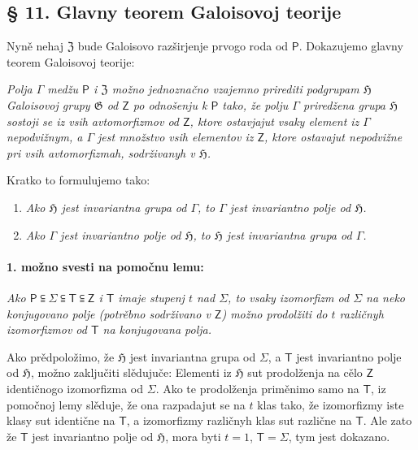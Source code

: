 \documentclass[11pt]{article}
\begin{document}
\subsection*{§ 11. Glavny teorem Galoisovoj teorije}\label{der-hauptsatz-der-galoisschen-theorie}

Nyně nehaj \(\mathfrak Z\) bude Galoisovo razširjenje prvogo roda od \(\mathsf P\). Dokazujemo glavny teorem Galoisovoj teorije:

\emph{Polja \(\Gamma\) medžu \(\mathsf P\) i \(\mathfrak Z\) možno jednoznačno vzajemno prirediti podgrupam \(\mathfrak H\) Galoisovoj grupy \(\mathfrak G\) od \(\mathsf{Z}\) po odnošenju k \(\mathsf P\) tako, že polju \(\Gamma\) priredžena grupa \(\mathfrak H\) sostoji se iz vsih avtomorfizmov od \(\mathsf{Z}\), ktore ostavjajut vsaky element iz \(\Gamma\) nepodvižnym, a \(\Gamma\) jest množstvo vsih elementov iz \(\mathsf{Z}\), ktore ostavajut nepodvižne pri vsih avtomorfizmah, sodrživanyh v \(\mathfrak H\).}

Kratko to formulujemo tako:

\begin{enumerate}
\item \emph{Ako \(\mathfrak H\) jest invariantna grupa od \(\Gamma\), to \(\Gamma\) jest invariantno polje od \(\mathfrak H\).}
\item \emph{Ako \(\Gamma\) jest invariantno polje od \(\mathfrak H\), to \(\mathfrak H\) jest invariantna grupa od \(\Gamma\).}
\end{enumerate}

\paragraph{1. možno svesti na pomočnu lemu:}\label{laesst-sich-zurueckfuehren-auf-den-hilfssatz}

\emph{Ako \(\mathsf P \subseteqq \Sigma \subseteqq \mathsf T \subseteqq \mathsf Z\) i \(\mathsf T\) imaje stupenj \(t\) nad \(\Sigma\), to vsaky izomorfizm od \(\Sigma\) na neko konjugovano polje (potrěbno sodrživano v \(\mathsf Z\)) možno prodolžiti do \(t\) različnyh izomorfizmov od \(\mathsf T\) na konjugovana polja.}

Ako prědpoložimo, že \(\mathfrak H\) jest invariantna grupa od \(\Sigma\), a \(\mathsf T\) jest invariantno polje od \(\mathfrak H\), možno zaključiti slědujuče: Elementi iz \(\mathfrak H\) sut prodolženja na cělo \(\mathsf Z\) identičnogo izomorfizma od \(\Sigma\). Ako te prodolženja priměnimo samo na \(\mathsf T\), iz pomočnoj lemy slěduje, že ona razpadajut se na \(t\) klas tako, že izomorfizmy iste klasy sut identične na \(\mathsf T\), a izomorfizmy različnyh klas sut različne na \(\mathsf T\). Ale zato že \(\mathsf T\) jest invariantno polje od \(\mathfrak H\), mora byti \(t=1\), \(\mathsf T=\Sigma\), tym jest dokazano.
\end{document}
